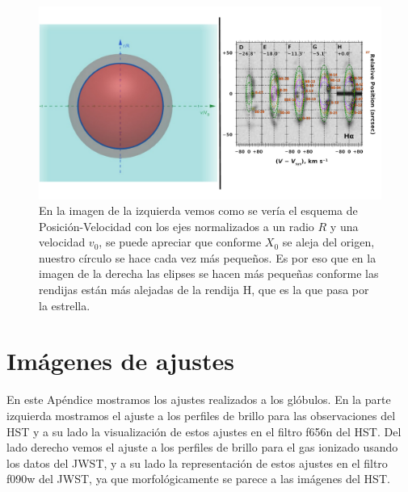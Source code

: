 \documentclass{book}
\begin{document}
\begin{figure}
    \centering
    \includegraphics[width=\textwidth]{imagenes_corregidas/n_esfe_03.pdf}
    \caption{En la imagen de la izquierda vemos como se vería el esquema de Posición-Velocidad con los ejes normalizados a un radio $R$ y una velocidad $v_0$, se puede apreciar que conforme $X_0$ se aleja del origen, nuestro círculo se hace cada vez más pequeños. Es por eso que en la imagen de la derecha las elipses se hacen más pequeñas conforme las rendijas están más alejadas de la rendija H, que es la que pasa por la estrella. }
    \label{fig: ap PV modelo}
\end{figure}


\chapter{Imágenes de ajustes}\label{App : ajustes}

En este Apéndice mostramos los ajustes realizados a los glóbulos. En la parte izquierda mostramos el ajuste a los perfiles de brillo para las observaciones del HST y a su lado la visualización de estos ajustes en el filtro f656n del HST. Del lado derecho vemos el ajuste a los perfiles de brillo para el gas ionizado usando los datos del JWST, y a su lado la representación de estos ajustes en el filtro f090w del JWST, ya que morfológicamente se parece a las imágenes del HST.
\end{document}
